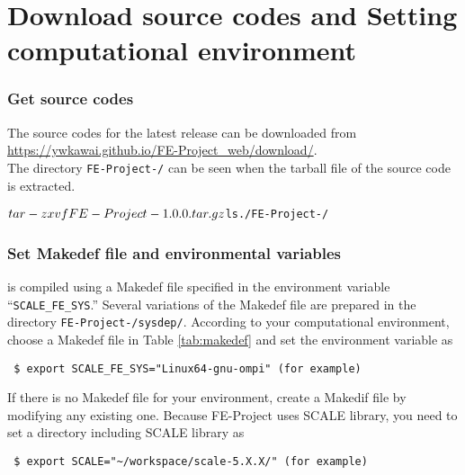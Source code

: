 \section{Download source codes and Setting computational environment} \label{sec:download}

\subsubsection{Get source codes} %
The source codes for the latest release can be downloaded
from \url{https://ywkawai.github.io/FE-Project_web/download/}.\\
The directory \texttt{FE-Project-{\version}/} can be seen when the tarball file of the source code is extracted.
\begin{alltt}
 $ tar -zxvf FE-Project-{\version}.tar.gz
 $ ls ./FE-Project-{\version}/
\end{alltt}

\subsubsection{Set Makedef file and environmental variables} \label{subsec:environment}

\scaledg is compiled using a Makedef file
specified in the environment variable ``\verb|SCALE_FE_SYS|.''
Several variations of the Makedef file are prepared in the directory \texttt{FE-Project-{\version}/sysdep/}.
According to your computational environment, 
choose a Makedef file in Table \ref{tab:makedef} and set the environment variable as
\begin{verbatim}
 $ export SCALE_FE_SYS="Linux64-gnu-ompi" (for example)
\end{verbatim}
If there is no Makedef file for your environment, 
create a Makedif file by modifying any existing one.
Because FE-Project uses SCALE library, 
you need to set a directory including SCALE library as 
\begin{verbatim}
 $ export SCALE="~/workspace/scale-5.X.X/" (for example)
\end{verbatim}


